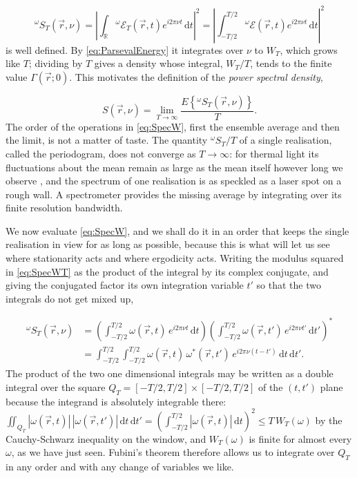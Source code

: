 		\begin{equation}\label{eq:SpecWT}
			^\omega S_T (\vec{r},\nu) = \left| \int_\mathbb{R} {}^\omega \mathcal{E}_T(\vec{r},t)e^{i2\pi\nu t}\,\mathrm{d}t \right|^2 = \left| \int_{-T/2}^{T/2}{}^\omega \mathcal{E}(\vec{r},t)e^{i2\pi\nu t}\,\mathrm{d}t \right|^2
		\end{equation}
		is well defined. By \eqref{eq:ParsevalEnergy} it integrates over $\nu$ to $W_{T}$, which
		grows like $T$; dividing by $T$ gives a density whose integral, $W_{T}/T$, tends to the
		finite value $\Gamma(\vec{r};0)$. This motivates the definition of the
		\textit{power spectral density},

		\begin{equation}\label{eq:SpecW}
			S(\vec{r},\nu) = \lim_{T \to \infty} \frac{E\left\{{}^\omega S_T(\vec{r},\nu)\right\}}{T}.
		\end{equation}
		The order of the operations in \eqref{eq:SpecW}, first the ensemble average and then the
		limit, is not a matter of taste. The quantity ${}^\omega S_{T}/T$ of a single realisation,
		called the periodogram, does not converge as $T\to\infty$: for thermal light its
		fluctuations about the mean remain as large as the mean itself however long we observe
		\citep{goodman2015statistical}, and the spectrum of one realisation is as speckled as a
		laser spot on a rough wall. A spectrometer provides the missing average by integrating
		over its finite resolution bandwidth.

		We now evaluate \eqref{eq:SpecW}, and we shall do it in an order that keeps the
		single realisation in view for as long as possible, because this is what will let us see
		where stationarity acts and where ergodicity acts. Writing the modulus squared in
		\eqref{eq:SpecWT} as the product of the integral by its complex conjugate, and giving the
		conjugated factor its own integration variable $t'$ so that the two integrals do not get
		mixed up,

		\begin{align}
			{}^\omega S_{T}(\vec{r},\nu) &= \left(\int_{-T/2}^{T/2}\omega(\vec{r},t)\,e^{i2\pi\nu t}\,\mathrm{d}t\right)\left(\int_{-T/2}^{T/2}\omega(\vec{r},t')\,e^{i2\pi\nu t'}\,\mathrm{d}t'\right)^{*} \nonumber\\
			&= \int_{-T/2}^{T/2}\int_{-T/2}^{T/2}\omega(\vec{r},t)\,\omega^{*}(\vec{r},t')\,e^{i2\pi\nu(t-t')}\,\mathrm{d}t\,\mathrm{d}t' . \label{eq:SpecWTdouble}
		\end{align}
		The product of the two one dimensional integrals may be written as a double integral
		over the square $Q_{T}=[-T/2,T/2]\times[-T/2,T/2]$ of the $(t,t')$ plane because the
		integrand is absolutely integrable there: $\iint_{Q_{T}}|\omega(\vec{r},t)|\,|\omega(\vec{r},t')|\,\mathrm{d}t\,\mathrm{d}t'
		=\left(\int_{-T/2}^{T/2}|\omega(\vec{r},t)|\,\mathrm{d}t\right)^{2}\leq T\,W_{T}(\omega)$
		by the Cauchy-Schwarz inequality on the window, and $W_{T}(\omega)$ is finite for almost
		every $\omega$, as we have just seen. Fubini's theorem therefore allows us to integrate
		over $Q_{T}$ in any order and with any change of variables we like.

